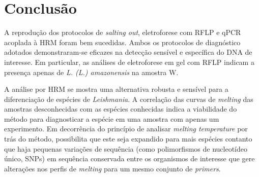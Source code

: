 \section{Conclusão}

A reprodução dos protocolos de \textit{salting out}, eletroforese com RFLP e
qPCR acoplada à HRM foram bem sucedidas. Ambos os protocolos de diagnóstico
adotados demonstraram-se eficazes na detecção sensível e específica do DNA de
interesse. Em particular, as análises de eletroforese em gel com RFLP indicam a
presença apenas de \textit{L. (L.) amazonensis} na amostra W. 

A análise por HRM se mostra uma alternativa robusta e sensível para a
diferenciação de espécies de \textit{Leishmania}. A correlação das curvas de
\textit{melting} das amostras desconhecidas com as espécies conhecidas indica a
viabilidade do método para diagnosticar a espécie em uma amostra com apenas um
experimento. Em decorrência do princípio de analisar \textit{melting
temperature} por trás do método, possibilita que este seja expandido para mais
espécies contanto que haja pequenas variações de sequência (como polimorfismos
de nucleotídeo único, SNPs) em sequência conservada entre os organismos de
interesse que gere alterações nos perfis de \textit{melting} para um mesmo
conjunto de \textit{primers}. 

